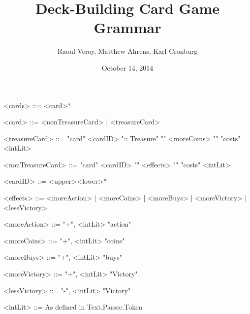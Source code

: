 \documentclass{article}
\title{Deck-Building Card Game Grammar}
\author{Raoul Veroy, Matthew Ahrens, Karl Cronburg}
\date{October 14, 2014}
\begin{document}
\maketitle
\thispagestyle{empty}

\begin{grammar}
<cards> ::= <card>*

<card>        ::= <nonTreasureCard> | <treasureCard>

<treasureCard> ::= "card" <cardID> ":: Treasure" "{" <moreCoins> "}" "costs" <intLit>

<nonTreasureCard> ::= "card" <cardID> "{" <effects> "}" "costs" <intLit>

<cardID>      ::= <upper><lower>*

<effects>     ::= <moreAction> | <moreCoins> | <moreBuys> | <moreVictory>  | <lessVictory>

<moreAction>  ::= "+", <intLit> "action"  

<moreCoins>   ::= "+", <intLit> "coins"  

<moreBuys>    ::= "+", <intLit> "buys"  

<moreVictory> ::= "+", <intLit> "Victory"  

<lessVictory> ::= "-", <intLit> "Victory"  

<intLit>      ::= As defined in Text.Parsec.Token

%
% 
% 
% 
\end{grammar}
\end{document}
